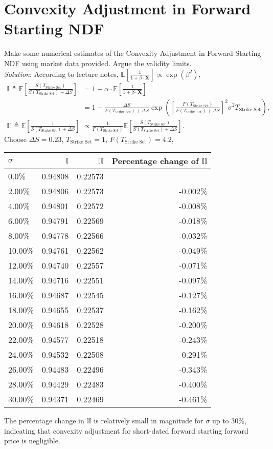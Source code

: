 \documentclass[paper=a4, fontsize=10pt,]{scrartcl} %
\theoremstyle{theorem}
\theoremstyle{remark}
\theoremstyle{example}
\numberwithin{equation}{section} %
\numberwithin{figure}{section} %
\numberwithin{table}{section} %
\begin{document}
\newpage

\section{Convexity Adjustment in Forward Starting NDF}
Make some numerical estimates of the Convexity Adjustment in Forward
Starting NDF using market data provided. Argue the validity limits.\\
\newline
\textit{Solution}: According to lecture notes, $\mathbb{E}\left[ \frac{1}{1+\beta\cdot\mathbf{X}} \right] \propto \exp(\beta^2)$,
\begin{align*}
\mathbb{I} \triangleq \mathbb{E}\left[ \frac{S(T_{\text{Strike Set}})}{S(T_{\text{Strike Set}}) + \Delta S} \right] &= 1 -\alpha\cdot \mathbb{E}\left[ \frac{1}{1+\beta\cdot\mathbf{X}} \right] \\
&= 1 - \frac{\Delta S}{ F(T_{\text{Strike Set}}) + \Delta S} \exp\left( \left[ \frac{F(T_{\text{Strike Set}})}{   F(T_{\text{Strike Set}}) + \Delta S } \right]^2 \sigma^2 T_{\text{Strike Set}}\right),\\
\mathbb{II}\triangleq\mathbb{E}\left[ \frac{1}{S(T_{\text{Strike Set}}) + \Delta S} \right] &\propto \frac{1}{F(T_{\text{Strike Set}})}\mathbb{E}\left[ \frac{S(T_{\text{Strike Set}})}{S(T_{\text{Strike Set}}) + \Delta S} \right].
\end{align*}
Choose $\Delta S = 0.23$, $T_{\text{Strike Set}}=1$, $F(T_{\text{Strike Set}}) = 4.2$,
\begin{center}
\begin{tabular}{lrrr}
\hline
$\sigma$              & $\mathbb{I}$ & $\mathbb{II}$ & Percentage change of $\mathbb{II}$ \\
\hline
0.0\%	& 0.94808		& 0.22573		& \\
2.00\%	& 	0.94806		& 0.22573		& -0.002\%\\
4.00\%	& 	0.94801		& 0.22572		& -0.008\%\\
6.00\%	& 	0.94791		& 0.22569		& -0.018\%\\
8.00\%	& 	0.94778		& 0.22566		& -0.032\%\\
10.00\%	& 	0.94761		& 0.22562		& -0.049\%\\
12.00\%	& 	0.94740		& 0.22557		& -0.071\%\\
14.00\%	& 	0.94716		& 0.22551		& -0.097\%\\
16.00\%	& 	0.94687		& 0.22545		& -0.127\%\\
18.00\%	& 	0.94655		& 0.22537		& -0.162\%\\
20.00\%	& 	0.94618		& 0.22528		& -0.200\%\\
22.00\%	& 	0.94577		& 0.22518		& -0.243\%\\
24.00\%	& 	0.94532		& 0.22508		& -0.291\%\\
26.00\%	& 	0.94483		& 0.22496		& -0.343\%\\
28.00\%	& 	0.94429		& 0.22483		& -0.400\%\\
30.00\%	& 	0.94371		& 0.22469		& -0.461\%\\
\hline
\end{tabular}
\end{center}
The percentage change in $\mathbb{II}$ is relatively small in magnitude for $\sigma$ up to 30\%, indicating that convexity adjustment
for short-dated forward starting forward price is negligible.
\end{document}
